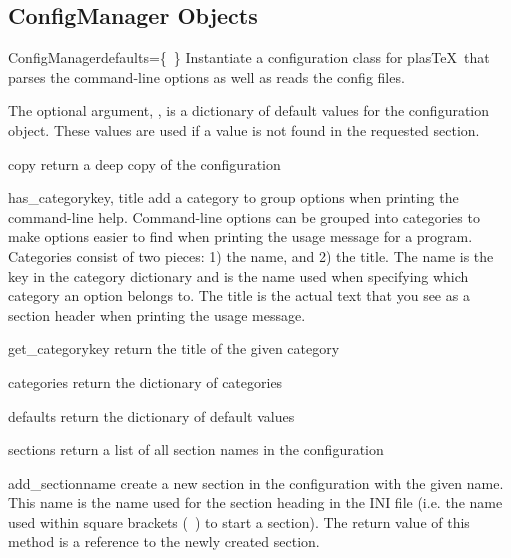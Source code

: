 \documentclass{manual}
\newcommand{\plasTeX}{plas\TeX}
\begin{document}
\subsection{ConfigManager Objects}

\begin{classdesc}{ConfigManager}{defaults=\{~\}}
Instantiate a configuration class for \plasTeX\ that parses the command-line options
as well as reads the config files.  

The optional argument, ,
is a dictionary of default values for the configuration object.  These 
values are used if a value is not found in the requested section.
\end{classdesc}

\begin{methoddesc}[ConfigManager]{copy}{}
return a deep copy of the configuration
\end{methoddesc}

\begin{methoddesc}[ConfigManager]{has\_category}{key, title}
add a category to group options when printing the command-line help.
Command-line options can be grouped into categories to make options easier
to find when printing the usage message for a program.  Categories consist
of two pieces: 1) the name, and 2) the title.  The name is the key in
the category dictionary and is the name used when specifying which category
an option belongs to.  The title is the actual text that you see as a 
section header when printing the usage message.
\end{methoddesc}

\begin{methoddesc}[ConfigManager]{get\_category}{key}
return the title of the given category
\end{methoddesc}

\begin{methoddesc}[ConfigManager]{categories}{}
return the dictionary of categories
\end{methoddesc}

\begin{methoddesc}[ConfigManager]{defaults}{}
return the dictionary of default values
\end{methoddesc}

\begin{methoddesc}[ConfigManager]{sections}{}
return a list of all section names in the configuration
\end{methoddesc}

\begin{methoddesc}[ConfigManager]{add\_section}{name}
create a new section in the configuration with the given name.  This 
name is the name used for the section heading in the INI file (i.e. the
name used within square brackets (\lbrack~\rbrack) to start a section).
The return value of this method is a reference to the newly created section.  
\end{methoddesc}
\end{document}
